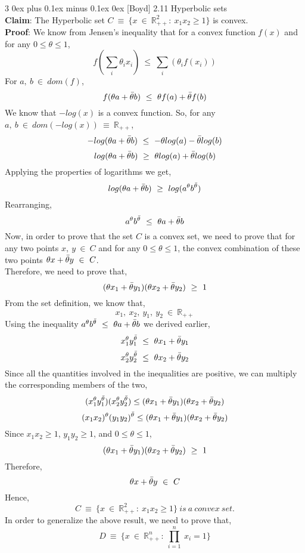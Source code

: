 \documentclass[12pt, draftcls, onecolumn]{IEEEtran}
\makeatletter
\def\subsubsection{\@startsection{subsubsection}%
                                 {3}%
                                 {\z@}%
                                 {0ex plus 0.1ex minus 0.1ex}%
                                 {0ex}%
                                 {\normalfont\normalsize\bfseries}}%
\makeatother
\begin{document}
\subsubsection{[Boyd] 2.11}
Hyperbolic sets
\\\textbf{Claim}: The Hyperbolic set $C\ \equiv\ \{x\ \in\ \mathbb{R}_{++}^2:\ x_1x_2 \geq 1\}$ is convex.
\\\textbf{Proof}: We know from Jensen's inequality that for a convex function $f(x)$ and for any $0 \leq \theta \leq 1$,
\[f(\sum_i \theta_i x_i)\ \leq\ \sum_i(\theta_i f(x_i))\]
For $a,\ b\ \in\ dom(f)$,
\[f(\theta a + \Bar{\theta} b)\ \leq\ \theta f(a) + \Bar{\theta} f(b)\]
We know that $-log(x)$ is a convex function. So, for any $a,\ b\ \in\ dom(-log(x))\ \equiv\ \mathbb{R}_{++}$,
\[-log(\theta a + \Bar{\theta} b)\ \leq\ -\theta log(a) - \Bar{\theta} log(b)\]
\[log(\theta a + \Bar{\theta} b)\ \geq\ \theta log(a) + \Bar{\theta} log(b)\]
Applying the properties of logarithms we get,
\[log(\theta a + \Bar{\theta} b)\ \geq\ log(a^\theta b^{\Bar{\theta}})\]
Rearranging,
\[a^\theta b^{\Bar{\theta}}\ \leq\ \theta a + \Bar{\theta} b\]
Now, in order to prove that the set $C$ is a convex set, we need to prove that for any two points $x,\ y\ \in\ C$ and for any $0 \leq \theta \leq 1$, the convex combination of these two points $\theta x + \Bar{\theta} y\ \in\ C$.
\\Therefore, we need to prove that,
\[(\theta x_1 + \Bar{\theta} y_1)(\theta x_2 + \Bar{\theta} y_2)\ \geq\ 1\]
From the set definition, we know that,
\[x_1,\ x_2,\ y_1,\ y_2\ \in\ \mathbb{R}_{++}\]
Using the inequality $a^\theta b^{\Bar{\theta}}\ \leq\ \theta a + \Bar{\theta} b$ we derived earlier,
\[x_1^\theta y_1^{\Bar{\theta}}\ \leq\ \theta x_1 + \Bar{\theta} y_1\]
\[x_2^\theta y_2^{\Bar{\theta}}\ \leq\ \theta x_2 + \Bar{\theta} y_2\]
Since all the quantities involved in the inequalities are positive, we can multiply the corresponding members of the two,
\[(x_1^\theta y_1^{\Bar{\theta}})(x_2^\theta y_2^{\Bar{\theta}}) \leq (\theta x_1 + \Bar{\theta} y_1)(\theta x_2 + \Bar{\theta} y_2)\]
\[(x_1x_2)^\theta (y_1y_2)^{\Bar{\theta}} \leq (\theta x_1 + \Bar{\theta} y_1)(\theta x_2 + \Bar{\theta} y_2)\]
Since $x_1x_2 \geq 1$, $y_1y_2 \geq 1$, and $0 \leq \theta \leq 1$,
\[(\theta x_1 + \Bar{\theta} y_1)(\theta x_2 + \Bar{\theta} y_2)\ \geq\ 1\]
Therefore,
\[\theta x + \Bar{\theta} y\ \in\ C\]
Hence,
\[C\ \equiv\ \{x\ \in\ \mathbb{R}_{++}^2:\ x_1x_2 \geq 1\}\ is\ a\ convex\ set.\]
In order to generalize the above result, we need to prove that,
\[D\ \equiv\ \{x\ \in\ \mathbb{R}_{++}^n:\ \prod_{i=1}^n\ x_i=1\}\]
\end{document}
